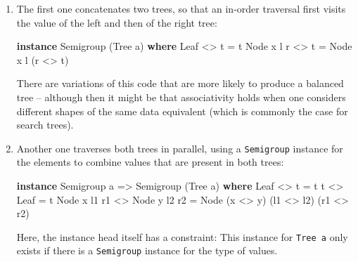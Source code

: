 \documentclass[11pt,
  american,
  DIV13]{article}
\newenvironment{Shaded}{}{}
\newcommand{\DataTypeTok}[1]{\textcolor[rgb]{0.56,0.13,0.00}{#1}}
\newcommand{\KeywordTok}[1]{\textcolor[rgb]{0.00,0.44,0.13}{\textbf{#1}}}
\newcommand{\NormalTok}[1]{#1}
\newcommand{\OperatorTok}[1]{\textcolor[rgb]{0.40,0.40,0.40}{#1}}
\newcommand{\OtherTok}[1]{\textcolor[rgb]{0.00,0.44,0.13}{#1}}
\begin{document}
\begin{enumerate}
\def\labelenumi{\arabic{enumi}.}
\item
  The first one concatenates two trees, so that an in-order traversal
  first visits the value of the left and then of the right tree:

\begin{Shaded}
\begin{Highlighting}[]
\KeywordTok{instance} \DataTypeTok{Semigroup}\NormalTok{ (}\DataTypeTok{Tree}\NormalTok{ a) }\KeywordTok{where}
    \DataTypeTok{Leaf} \OperatorTok{\textless{}\textgreater{}}\NormalTok{ t }\OtherTok{=}\NormalTok{ t}
    \DataTypeTok{Node}\NormalTok{ x l r }\OperatorTok{\textless{}\textgreater{}}\NormalTok{ t }\OtherTok{=} \DataTypeTok{Node}\NormalTok{ x l (r }\OperatorTok{\textless{}\textgreater{}}\NormalTok{ t)}
\end{Highlighting}
\end{Shaded}

  There are variations of this code that are more likely to produce a
  balanced tree -- although then it might be that associativity holds
  when one considers different shapes of the same data equivalent (which
  is commonly the case for search trees).
\item
  Another one traverses both trees in parallel, using a
  \texttt{Semigroup} instance for the elements to combine values that
  are present in both trees:

\begin{Shaded}
\begin{Highlighting}[]
\KeywordTok{instance} \DataTypeTok{Semigroup}\NormalTok{ a }\OtherTok{=\textgreater{}} \DataTypeTok{Semigroup}\NormalTok{ (}\DataTypeTok{Tree}\NormalTok{ a) }\KeywordTok{where}
    \DataTypeTok{Leaf} \OperatorTok{\textless{}\textgreater{}}\NormalTok{ t }\OtherTok{=}\NormalTok{ t}
\NormalTok{    t }\OperatorTok{\textless{}\textgreater{}} \DataTypeTok{Leaf} \OtherTok{=}\NormalTok{ t}
    \DataTypeTok{Node}\NormalTok{ x l1 r1 }\OperatorTok{\textless{}\textgreater{}} \DataTypeTok{Node}\NormalTok{ y l2 r2 }\OtherTok{=} \DataTypeTok{Node}\NormalTok{ (x }\OperatorTok{\textless{}\textgreater{}}\NormalTok{ y) (l1 }\OperatorTok{\textless{}\textgreater{}}\NormalTok{ l2) (r1 }\OperatorTok{\textless{}\textgreater{}}\NormalTok{ r2)}
\end{Highlighting}
\end{Shaded}

  Here, the instance head itself has a constraint: This instance for
  \texttt{Tree\ a} only exists if there is a \texttt{Semigroup} instance
  for the type of values.
\end{enumerate}
\end{document}
